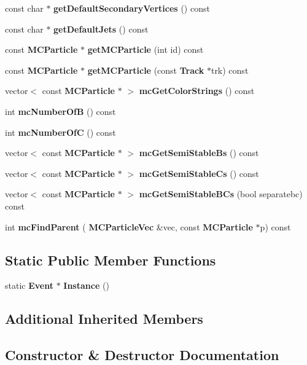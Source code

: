 \begin{DoxyCompactItemize}
\item 
const char $\ast$ \textbf{ get\+Default\+Secondary\+Vertices} () const
\item 
const char $\ast$ \textbf{ get\+Default\+Jets} () const
\item 
const \textbf{ M\+C\+Particle} $\ast$ \textbf{ get\+M\+C\+Particle} (int id) const
\item 
const \textbf{ M\+C\+Particle} $\ast$ \textbf{ get\+M\+C\+Particle} (const \textbf{ Track} $\ast$trk) const
\item 
vector$<$ const \textbf{ M\+C\+Particle} $\ast$ $>$ \textbf{ mc\+Get\+Color\+Strings} () const
\item 
int \textbf{ mc\+Number\+OfB} () const
\item 
int \textbf{ mc\+Number\+OfC} () const
\item 
vector$<$ const \textbf{ M\+C\+Particle} $\ast$ $>$ \textbf{ mc\+Get\+Semi\+Stable\+Bs} () const
\item 
vector$<$ const \textbf{ M\+C\+Particle} $\ast$ $>$ \textbf{ mc\+Get\+Semi\+Stable\+Cs} () const
\item 
vector$<$ const \textbf{ M\+C\+Particle} $\ast$ $>$ \textbf{ mc\+Get\+Semi\+Stable\+B\+Cs} (bool separatebc) const
\item 
int \textbf{ mc\+Find\+Parent} (\textbf{ M\+C\+Particle\+Vec} \&vec, const \textbf{ M\+C\+Particle} $\ast$p) const
\end{DoxyCompactItemize}
\subsection*{Static Public Member Functions}
\begin{DoxyCompactItemize}
\item 
static \textbf{ Event} $\ast$ \textbf{ Instance} ()
\end{DoxyCompactItemize}
\subsection*{Additional Inherited Members}


\subsection{Constructor \& Destructor Documentation}
\mbox{\label{classlcfiplus_1_1Event_a947199c20186456a74bc387e0daa2ade}} 
